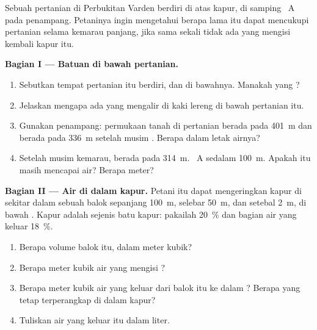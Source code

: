 \begin{problem}
\label{pb:g6:water-underground:1}
Sebuah pertanian di Perbukitan Varden berdiri di atas kapur, di samping
~A pada penampang. Petaninya ingin mengetahui berapa lama  itu
dapat mencukupi pertanian selama kemarau panjang, jika sama sekali tidak ada
 yang mengisi kembali kapur itu.

\medskip
\noindent\textbf{Bagian I --- Batuan di bawah pertanian.}
\begin{enumerate}
  \item Sebutkan  tempat pertanian itu berdiri, dan  di
        bawahnya. Manakah yang ?
  \item Jelaskan mengapa ada  yang mengalir di kaki lereng di bawah
        pertanian itu.
  \item Gunakan penampang: permukaan tanah di pertanian berada pada 401~m
        dan  berada pada 336~m setelah musim . Berapa
        dalam letak airnya?
  \item Setelah musim kemarau,  berada pada 314~m. ~A
        sedalam 100~m. Apakah  itu masih mencapai air? Berapa meter?
\end{enumerate}

\medskip
\noindent\textbf{Bagian II --- Air di dalam kapur.}
Petani itu dapat mengeringkan kapur di sekitar  dalam sebuah balok
sepanjang 100~m, selebar 50~m, dan setebal 2~m, di bawah .
Kapur adalah sejenis batu kapur: pakailah  20~\% dan bagian air
yang keluar 18~\%.
\begin{enumerate}[resume]
  \item Berapa volume balok itu, dalam meter kubik?
  \item Berapa meter kubik air yang mengisi ?
  \item Berapa meter kubik air yang keluar dari balok itu ke dalam ?
        Berapa yang tetap terperangkap di dalam kapur?
  \item Tuliskan air yang keluar itu dalam liter.
\end{enumerate}


\end{problem}
